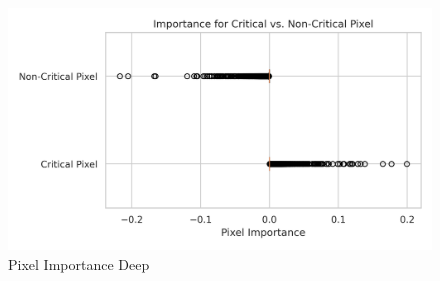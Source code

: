 \documentclass[10pt, conference, a4paper, final]{IEEEtran}
\begin{document}
        \begin{figure}
            \centering
            \includegraphics[width=0.9\linewidth]{deepexplainer/ttest2.png}
            \caption{Pixel Importance Deep}
        \end{figure}

        



\end{document}
